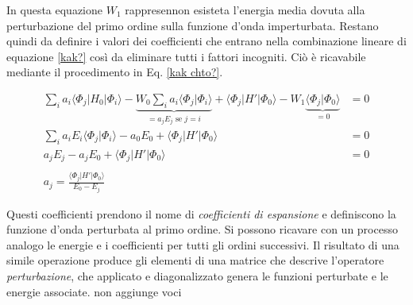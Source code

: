 \documentclass[oneside]{amsbook}
\numberwithin{section}{chapter}
\numberwithin{equation}{section}
\numberwithin{figure}{section}
\begin{document}
In questa equazione $W_1$ rappresennon esisteta l'energia media dovuta alla perturbazione del primo ordine sulla funzione d'onda imperturbata.
Restano quindi da definire i valori dei coefficienti che entrano nella combinazione lineare di equazione \ref{kak?} così da eliminare tutti i fattori incogniti. Ciò è ricavabile mediante il procedimento in Eq. \ref{kak chto?}.

\begin{equation}
\label{kak chto?}
\begin{aligned}
\sum_i a_i\langle \Phi_j \vert H_0 \vert \Phi_i \rangle - \underbrace{W_0 \sum_i a_i \langle \Phi_j \vert \Phi_i \rangle}_{= a_jE_j\text{ se }j=i} +\langle \Phi_j\vert H' \vert \Phi_0  \rangle -W_1\underbrace{ \langle \Phi_j\vert \Phi_0\rangle}_{=0} &= 0\\
\sum_i a_i E_i \langle \Phi_j\vert \Phi_i \rangle -a_0 E_0 + \langle \Phi_j \vert H' \vert \Phi_0 \rangle  &= 0 \\
a_j E_j -a_jE_0 + \langle \Phi_j \vert H' \vert \Phi_0 \rangle  &= 0 \\ \\
a_j = \frac{\langle \Phi_j \vert H' \vert \Phi_0 \rangle}{E_0-E_j}
\end{aligned}
\end{equation}

Questi coefficienti prendono il nome di \emph{coefficienti di espansione} e definiscono la funzione d'onda perturbata al primo ordine. Si possono ricavare con un processo analogo le energie e i coefficienti per tutti gli ordini successivi. Il risultato di una simile operazione produce gli elementi di una matrice che descrive l'operatore \emph{perturbazione}, che applicato e diagonalizzato genera le funzioni perturbate e le energie associate.  
  non aggiunge voci
\end{document}
